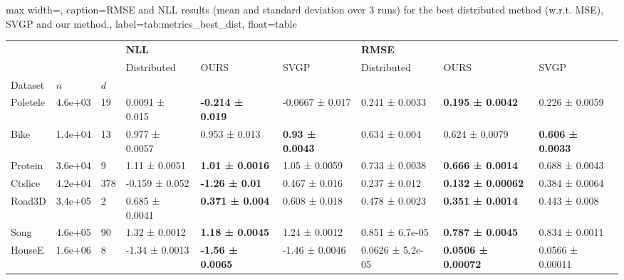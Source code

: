 \begin{adjustbox}{max width=\textwidth, caption={RMSE and NLL results (mean and standard deviation over 3 runs) for the best distributed method (w.r.t. MSE), SVGP and our method.}, 
label={tab:metrics_best_dist}, float=table}
\setlength{\tabcolsep}{3pt} %
\begin{tabular}{lllllllll}
\toprule
 &  &  & \multicolumn{3}{l}{\textbf{NLL}} & \multicolumn{3}{l}{\textbf{RMSE}} \\
 &  &  & Distributed & OURS & SVGP & Distributed & OURS & SVGP \\
Dataset & \(n\) & \(d\) &  &  &  &  &  &  \\
\midrule
Poletele & 4.6e+03 & 19 & 0.0091 ± 0.015 & \bfseries -0.214 ± 0.019 & -0.0667 ± 0.017 & 0.241 ± 0.0033 & \bfseries 0.195 ± 0.0042 & 0.226 ± 0.0059 \\
Bike & 1.4e+04 & 13 & 0.977 ± 0.0057 & 0.953 ± 0.013 & \bfseries 0.93 ± 0.0043 & 0.634 ± 0.004 & 0.624 ± 0.0079 & \bfseries 0.606 ± 0.0033 \\
Protein & 3.6e+04 & 9 & 1.11 ± 0.0051 & \bfseries 1.01 ± 0.0016 & 1.05 ± 0.0059 & 0.733 ± 0.0038 & \bfseries 0.666 ± 0.0014 & 0.688 ± 0.0043 \\
Ctslice & 4.2e+04 & 378 & -0.159 ± 0.052 & \bfseries -1.26 ± 0.01 & 0.467 ± 0.016 & 0.237 ± 0.012 & \bfseries 0.132 ± 0.00062 & 0.384 ± 0.0064 \\
Road3D & 3.4e+05 & 2 & 0.685 ± 0.0041 & \bfseries 0.371 ± 0.004 & 0.608 ± 0.018 & 0.478 ± 0.0023 & \bfseries 0.351 ± 0.0014 & 0.443 ± 0.008 \\
Song & 4.6e+05 & 90 & 1.32 ± 0.0012 & \bfseries 1.18 ± 0.0045 & 1.24 ± 0.0012 & 0.851 ± 6.7e-05 & \bfseries 0.787 ± 0.0045 & 0.834 ± 0.0011 \\
HouseE & 1.6e+06 & 8 & -1.34 ± 0.0013 & \bfseries -1.56 ± 0.0065 & -1.46 ± 0.0046 & 0.0626 ± 5.2e-05 & \bfseries 0.0506 ± 0.00072 & 0.0566 ± 0.00011 \\
\bottomrule
\end{tabular}
\end{adjustbox}

